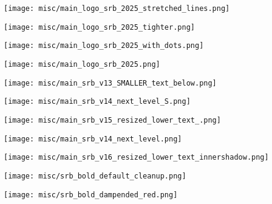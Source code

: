 \begin{center}
  \texttt{[image: misc/main\_logo\_srb\_2025\_stretched\_lines.png]}
\end{center}

\begin{center}
  \texttt{[image: misc/main\_logo\_srb\_2025\_tighter.png]}
\end{center}

\begin{center}
  \texttt{[image: misc/main\_logo\_srb\_2025\_with\_dots.png]}
\end{center}

\begin{center}
  \texttt{[image: misc/main\_logo\_srb\_2025.png]}
\end{center}

\begin{center}
  \texttt{[image: misc/main\_srb\_v13\_SMALLER\_text\_below.png]}
\end{center}

\begin{center}
  \texttt{[image: misc/main\_srb\_v14\_next\_level\_S.png]}
\end{center}

\begin{center}
  \texttt{[image: misc/main\_srb\_v15\_resized\_lower\_text\_.png]}
\end{center}

\begin{center}
  \texttt{[image: misc/main\_srb\_v14\_next\_level.png]}
\end{center}

\begin{center}
  \texttt{[image: misc/main\_srb\_v16\_resized\_lower\_text\_innershadow.png]}
\end{center}

\begin{center}
  \texttt{[image: misc/srb\_bold\_default\_cleanup.png]}
\end{center}

\begin{center}
  \texttt{[image: misc/srb\_bold\_dampended\_red.png]}
\end{center}
